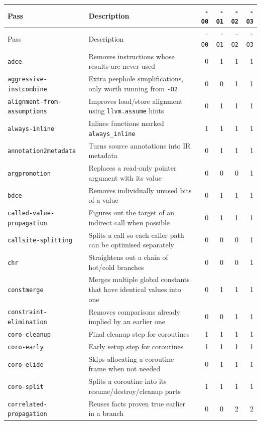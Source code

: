 \documentclass[11pt,a4paper]{article}
\begin{document}
{\small
\begin{longtable}{lp{6.4cm}rrrr}
\hline
Pass & Description & \texttt{-O0} & \texttt{-O1} & \texttt{-O2} & \texttt{-O3} \\
\hline
\endfirsthead
\hline
Pass & Description & \texttt{-O0} & \texttt{-O1} & \texttt{-O2} & \texttt{-O3} \\
\hline
\endhead
\texttt{adce} & Removes instructions whose results are never used & 0 & 1 & 1 & 1 \\
\texttt{aggressive-instcombine} & Extra peephole simplifications, only worth running from \texttt{-O2} & 0 & 0 & 1 & 1 \\
\texttt{alignment-from-assumptions} & Improves load/store alignment using \texttt{llvm.assume} hints & 0 & 1 & 1 & 1 \\
\texttt{always-inline} & Inlines functions marked \texttt{always\_inline} & 1 & 1 & 1 & 1 \\
\texttt{annotation2metadata} & Turns source annotations into IR metadata & 0 & 1 & 1 & 1 \\
\texttt{argpromotion} & Replaces a read-only pointer argument with its value & 0 & 0 & 0 & 1 \\
\texttt{bdce} & Removes individually unused bits of a value & 0 & 1 & 1 & 1 \\
\texttt{called-value-propagation} & Figures out the target of an indirect call when possible & 0 & 1 & 1 & 1 \\
\texttt{callsite-splitting} & Splits a call so each caller path can be optimised separately & 0 & 0 & 0 & 1 \\
\texttt{chr} & Straightens out a chain of hot/cold branches & 0 & 0 & 0 & 1 \\
\texttt{constmerge} & Merges multiple global constants that have identical values into one & 0 & 1 & 1 & 1 \\
\texttt{constraint-elimination} & Removes comparisons already implied by an earlier one & 0 & 0 & 1 & 1 \\
\texttt{coro-cleanup} & Final cleanup step for coroutines & 1 & 1 & 1 & 1 \\
\texttt{coro-early} & Early setup step for coroutines & 1 & 1 & 1 & 1 \\
\texttt{coro-elide} & Skips allocating a coroutine frame when not needed & 0 & 1 & 1 & 1 \\
\texttt{coro-split} & Splits a coroutine into its resume/destroy/cleanup parts & 1 & 1 & 1 & 1 \\
\texttt{correlated-propagation} & Reuses facts proven true earlier in a branch & 0 & 0 & 2 & 2 \\

\end{longtable}}
\end{document}
